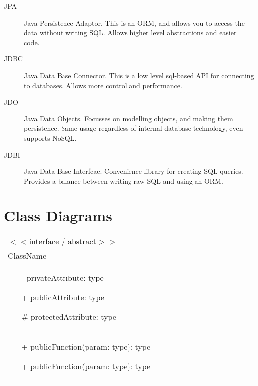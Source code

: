 \documentclass[landscape]{cheat}
\begin{document}
\begin{multicols*}{3}
\begin{description}
    \item[JPA] Java Persistence Adaptor.
        This is an ORM, and allows you to access the data without writing SQL.
        Allows higher level abstractions and easier code.
    \item[JDBC] Java Data Base Connector.
        This is a low level sql-based API for connecting to databases.
        Allows more control and performance.
    \item[JDO] Java Data Objects.
        Focusses on modelling objects, and making them persistence.
        Same usage regardless of internal database technology, even supports NoSQL.
    \item[JDBI] Java Data Base Interfcae.
        Convenience library for creating SQL queries.
        Provides a balance between writing raw SQL and using an ORM.
\end{description}

\section{Class Diagrams}

\begin{tabular}{|p{}|}
\hline
    $<<$interface / abstract$>>$ \\
    ClassName \\
\hline
\begin{itemize}
    \item[-] privateAttribute: type
    \item[+] publicAttribute: type
    \item[\#] protectedAttribute: type
\end{itemize} \\ \hline
\begin{itemize}
    \item[+] publicFunction(param: type): type
    \item[+] publicFunction(param: type): type
\end{itemize} \\ \hline
\end{tabular}


\end{multicols*}
\end{document}
